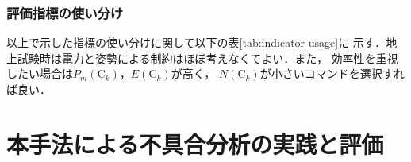 \documentclass[11pt]{jsarticle}%
\begin{document}
\begin{multicols}{2}
\subsubsection{評価指標の使い分け}
以上で示した指標の使い分けに関して以下の表\ref{tab:indicator usage}に
示す．地上試験時は電力と姿勢による制約はほぼ考えなくてよい．また，
効率性を重視したい場合は$P_m(\text{C}_k)$，$E(\text{C}_k)$が高く，
$N(\text{C}_k)$が小さいコマンドを選択すれば良い．

\begin{table}[H]
  \centering %
  \caption{地上試験と運用時での指標の優先度(\textcolor{red}{赤}：安全重視，黒：効率重視)}
  \label{tab:indicator usage}
\end{table}

  \section{本手法による不具合分析の実践と評価}
  \vspace{-1zh}

\end{multicols}
\end{document}

